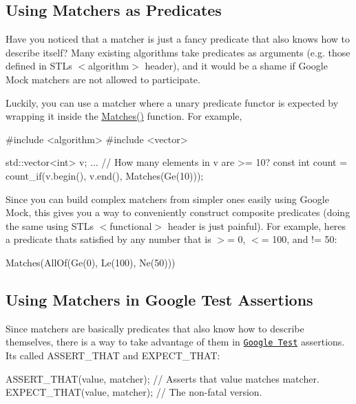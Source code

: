 \subsection*{Using Matchers as Predicates}

Have you noticed that a matcher is just a fancy predicate that also knows how to describe itself? Many existing algorithms take predicates as arguments (e.\+g. those defined in S\+TL\textquotesingle{}s {\ttfamily $<$algorithm$>$} header), and it would be a shame if Google Mock matchers are not allowed to participate.

Luckily, you can use a matcher where a unary predicate functor is expected by wrapping it inside the {\ttfamily \hyperlink{namespacetesting_ad53b509ae9cd51040d67f668f99702ae}{Matches()}} function. For example,


\begin{DoxyCode}
#include <algorithm>
#include <vector>

std::vector<int> v;
...
// How many elements in v are >= 10?
const int count = count\_if(v.begin(), v.end(), Matches(Ge(10)));
\end{DoxyCode}


Since you can build complex matchers from simpler ones easily using Google Mock, this gives you a way to conveniently construct composite predicates (doing the same using S\+TL\textquotesingle{}s {\ttfamily $<$functional$>$} header is just painful). For example, here\textquotesingle{}s a predicate that\textquotesingle{}s satisfied by any number that is $>$= 0, $<$= 100, and != 50\+:


\begin{DoxyCode}
Matches(AllOf(Ge(0), Le(100), Ne(50)))
\end{DoxyCode}


\subsection*{Using Matchers in Google Test Assertions}

Since matchers are basically predicates that also know how to describe themselves, there is a way to take advantage of them in \href{http://code.google.com/p/googletest/}{\tt Google Test} assertions. It\textquotesingle{}s called {\ttfamily A\+S\+S\+E\+R\+T\+\_\+\+T\+H\+AT} and {\ttfamily E\+X\+P\+E\+C\+T\+\_\+\+T\+H\+AT}\+:


\begin{DoxyCode}
ASSERT\_THAT(value, matcher);  // Asserts that value matches matcher.
EXPECT\_THAT(value, matcher);  // The non-fatal version.
\end{DoxyCode}


